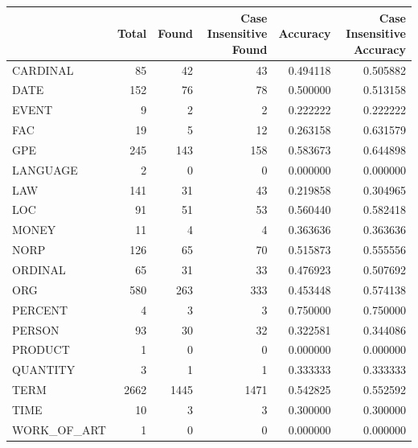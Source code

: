 \begin{tabular}{lrrrrr}
\toprule
 & Total & Found & Case Insensitive Found & Accuracy & Case Insensitive Accuracy \\
\midrule
CARDINAL & 85 & 42 & 43 & 0.494118 & 0.505882 \\
DATE & 152 & 76 & 78 & 0.500000 & 0.513158 \\
EVENT & 9 & 2 & 2 & 0.222222 & 0.222222 \\
FAC & 19 & 5 & 12 & 0.263158 & 0.631579 \\
GPE & 245 & 143 & 158 & 0.583673 & 0.644898 \\
LANGUAGE & 2 & 0 & 0 & 0.000000 & 0.000000 \\
LAW & 141 & 31 & 43 & 0.219858 & 0.304965 \\
LOC & 91 & 51 & 53 & 0.560440 & 0.582418 \\
MONEY & 11 & 4 & 4 & 0.363636 & 0.363636 \\
NORP & 126 & 65 & 70 & 0.515873 & 0.555556 \\
ORDINAL & 65 & 31 & 33 & 0.476923 & 0.507692 \\
ORG & 580 & 263 & 333 & 0.453448 & 0.574138 \\
PERCENT & 4 & 3 & 3 & 0.750000 & 0.750000 \\
PERSON & 93 & 30 & 32 & 0.322581 & 0.344086 \\
PRODUCT & 1 & 0 & 0 & 0.000000 & 0.000000 \\
QUANTITY & 3 & 1 & 1 & 0.333333 & 0.333333 \\
TERM & 2662 & 1445 & 1471 & 0.542825 & 0.552592 \\
TIME & 10 & 3 & 3 & 0.300000 & 0.300000 \\
WORK_OF_ART & 1 & 0 & 0 & 0.000000 & 0.000000 \\
\bottomrule
\end{tabular}
